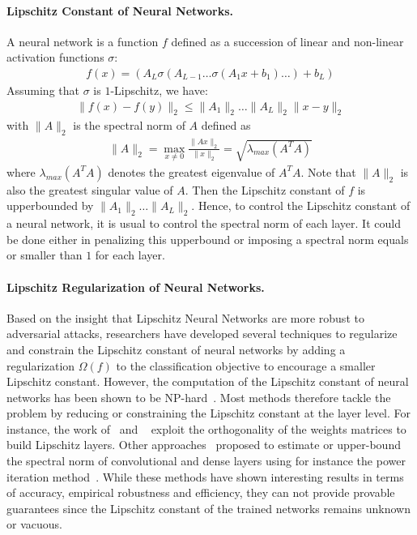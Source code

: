 \paragraph{Lipschitz Constant of Neural Networks.}  A neural network is a function $f$ defined as a succession of linear and non-linear activation functions $\sigma$:
\begin{align*}
  f(x) = \left(A_L\sigma\left(A_{L-1}\dots \sigma\left(A_1x+b_1\right)\dots\right)+b_L\right)
\end{align*}
Assuming that $\sigma$ is $1$-Lipschitz, we have:
\begin{align*}
  \lVert f(x)-f(y)\rVert_2\leq \lVert A_1\rVert_2\dots \lVert A_L\rVert_2\lVert x-y\rVert_2
\end{align*}
with $\lVert A\rVert_2$ is the spectral norm of $A$ defined as
\begin{align*}
  \lVert A\rVert_2 = \max_{x\neq 0} \frac{\lVert Ax\rVert_2}{\lVert x\rVert_2} = \sqrt{\lambda_{max}(A^TA)}
\end{align*}
where $\lambda_{max}(A^TA)$ denotes the greatest eigenvalue of $A^TA$. Note that $\lVert A\rVert_2$ is also the greatest singular value of $A$.  
Then the Lipschitz constant of $f$ is upperbounded by $\lVert A_1\rVert_2\dots \lVert A_L\rVert_2$. Hence, to control the Lipschitz constant of a neural network, it is usual to control the spectral norm of each layer. It could be done either in penalizing this upperbound or imposing a spectral norm  equals or smaller than $1$ for each layer. 

\paragraph{Lipschitz Regularization of Neural Networks.}  Based on the insight that Lipschitz Neural Networks are more robust to adversarial attacks, researchers have developed several techniques to regularize and constrain the Lipschitz constant of neural networks by adding a regularization $\Omega(f)$ to the classification objective to encourage a smaller Lipschitz constant.
However, the computation of the Lipschitz constant of neural networks has been shown to be NP-hard~\citep{scaman2018lipschitz}.  Most methods therefore tackle the problem by reducing or constraining the Lipschitz constant at the layer level.
For instance, the work of~\citet{cisse2017parseval,huang2020controllable} and ~\citet{wang2020orthogonal} exploit the orthogonality of the weights matrices to build Lipschitz layers.
Other approaches~\citep{gouk2018regularisation,jia2017improving,sedghi2018singular,singla2021fantastic,araujo2021lipschitz} proposed to estimate or upper-bound the spectral norm of convolutional and dense layers using for instance the power iteration method~\citep{golub2000eigenvalue}.
While these methods have shown interesting results in terms of accuracy, empirical robustness and efficiency, they can not provide provable guarantees since the Lipschitz constant of the trained networks remains unknown or vacuous.



